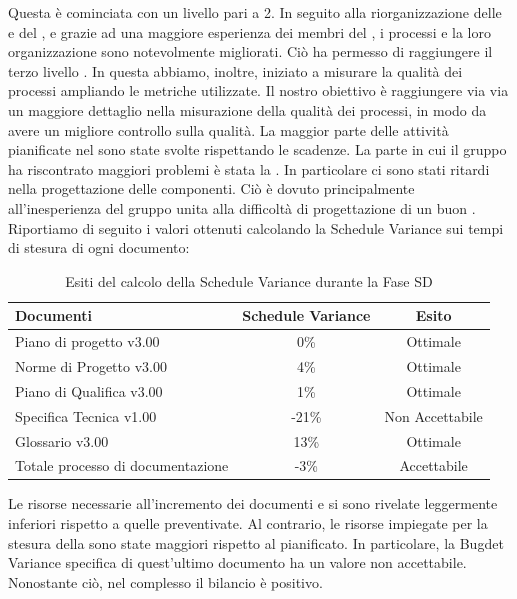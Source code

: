 			Questa  è cominciata con un livello  pari a 2. In seguito alla riorganizzazione delle  e del , e grazie ad una maggiore esperienza dei membri del , i processi e la loro organizzazione sono notevolmente migliorati. Ciò ha permesso di raggiungere il terzo livello . In questa  abbiamo, inoltre, iniziato a misurare la qualità dei processi ampliando le metriche utilizzate. Il nostro obiettivo è raggiungere via via un maggiore dettaglio nella misurazione della qualità dei processi, in modo da avere un migliore controllo sulla qualità.
			La maggior parte delle attività pianificate nel  sono state svolte rispettando le scadenze. La parte in cui il gruppo ha riscontrato maggiori problemi è stata la . In particolare ci sono stati ritardi nella progettazione delle componenti. Ciò è dovuto principalmente all'inesperienza del gruppo unita alla difficoltà di progettazione di un buon .\\
			Riportiamo di seguito i valori ottenuti calcolando la Schedule Variance sui tempi di stesura di ogni documento:
			\begin{table}[H]
					\centering
					\begin{tabu}{| l | c | c |}
							\hline
							Documenti 							& Schedule Variance	& Esito		\\ \hline \hline
							
							Piano di progetto v3.00				& 0\% 		& Ottimale  \\ \hline
							Norme di Progetto v3.00 			& 4\%		& Ottimale  \\ \hline
							Piano di Qualifica v3.00 			& 1\%		& Ottimale  \\ \hline
							Specifica Tecnica v1.00 			& -21\%		& Non Accettabile  \\ \hline
							Glossario v3.00					 	& 13\% 		& Ottimale  \\ \hline
							Totale processo di documentazione & -3\% & Accettabile \\ \hline
						\end{tabu}
					\caption{Esiti del calcolo della Schedule Variance durante la Fase SD}
				\end{table}
			Le risorse necessarie all'incremento dei documenti  e  si sono rivelate leggermente inferiori rispetto a quelle preventivate. Al contrario, le risorse impiegate per la stesura della  sono state maggiori rispetto al pianificato. In particolare, la Bugdet Variance specifica di quest'ultimo documento ha un valore non accettabile. Nonostante ciò, nel complesso il bilancio è positivo.\\
